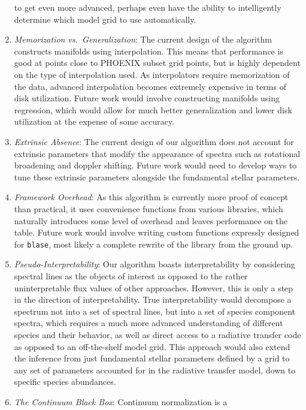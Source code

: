 \documentclass[twocolumn]{aastex631}
\begin{document}
\begin{enumerate}[label=-]
    to get even more advanced, perhaps even have the ability to intelligently
    determine which model grid to use automatically.
    \item \textit{Memorization vs.\ Generalization}: The current design of
    the algorithm constructs manifolds using interpolation. This means that
    performance is good at points close to PHOENIX subset grid points, but
    is highly dependent on the type of interpolation used. As interpolators
    require memorization of the data, advanced interpolation becomes extremely
    expensive in terms of disk utilization. Future work would involve 
    constructing manifolds using regression, which would allow for much
    better generalization and lower disk utilization at the expense of
    some accuracy.
    \item \textit{Extrinsic Absence}: The current design of our algorithm
    does not account for extrinsic parameters that modify the appearance of 
    spectra such as rotational broadening and doppler shifting. Future work
    would need to develop ways to tune these extrinsic parameters alongside
    the fundamental stellar parameters.
    \item \textit{Framework Overhead}: As this algorithm is currently more 
    proof of concept than practical, it uses convenience functions from 
    various libraries, which naturally introduces some level of overhead and 
    leaves performance on the table. Future work would involve writing 
    custom functions expressly designed for \texttt{blase}, most likely a 
    complete rewrite of the library from the ground up.
    \item \textit{Pseudo-Interpretability}: Our algorithm boasts interpretability
    by considering spectral lines as the objects of interest as opposed to 
    the rather uninterpretable flux values of other approaches. However, this
    is only a step in the direction of interpretability. True interpretability
    would decompose a spectrum not into a set of spectral lines, but into a
    set of species component spectra, which requires a much more advanced 
    understanding of different species and their behavior, as well as
    direct access to a radiative transfer code as opposed to an off-the-shelf
    model grid. This approach would also extend the inference from just
    fundamental stellar parameters defined by a grid to any set of parameters
    accounted for in the radiative transfer model, down to specific species
    abundances.
    \item \textit{The Continuum Black Box}: Continuum normalization is a

\end{enumerate}
\end{document}
